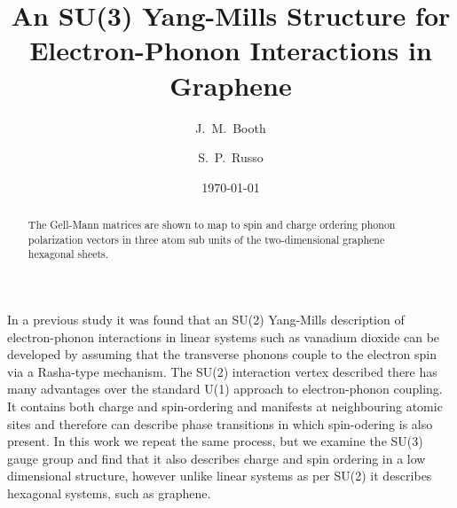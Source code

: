 \documentclass[prb,showpacs,superscriptaddress,titlepage,amsmath,amssymb,twocolumn]{revtex4-1}
\begin{document}
\title{
An SU(3) Yang-Mills Structure for Electron-Phonon Interactions in Graphene
}
\author{J.~M.~Booth}

\author{S.~P.~Russo}

\date{\today}

\begin{abstract}
The Gell-Mann matrices are shown to map to spin and charge ordering phonon polarization vectors in three atom sub units of the two-dimensional graphene hexagonal sheets.
\end{abstract}

\maketitle
In a previous study\cite{Booth2020} it was found that an SU(2) Yang-Mills description of electron-phonon interactions in linear systems such as vanadium dioxide can be developed by assuming that the transverse phonons couple to the electron spin via a Rasha-type mechanism. The SU(2) interaction vertex described there has many advantages over the standard U(1) approach to electron-phonon coupling. It contains both charge and spin-ordering and manifests at neighbouring atomic sites and therefore can describe phase transitions in which spin-odering is also present.
In this work we repeat the same process, but we examine the SU(3) gauge group and find that it also describes charge and spin ordering in a low dimensional structure, however unlike linear systems as per SU(2) it describes hexagonal systems, such as graphene.


\end{document}
